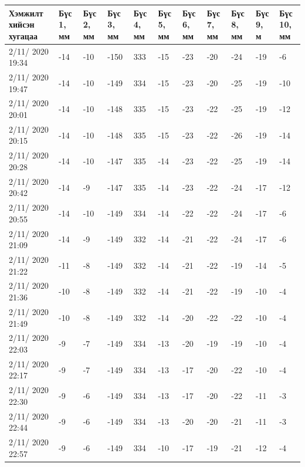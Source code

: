 \begin{table}[h]
    \centering
    \begin{tabular}{|p{1.5cm}|p{0.8cm}|p{0.8cm}|p{0.8cm}|p{0.8cm}|p{0.8cm}|p{0.8cm}|p{0.8cm}|p{0.8cm}|p{0.8cm}|p{0.8cm}|}
         \hline
     Хэмжилт хийсэн хугацаа & Бүс 1, мм&	Бүс 2, мм&	Бүс 3, мм&	Бүс 4, мм&	Бүс 5, мм&	Бүс 6, мм&	Бүс 7, мм&	Бүс 8, мм&	Бүс 9, м&	Бүс 10, мм \\ \hline
2/11/ 2020 19:34&	-14&	-10&-150&	333&-15&-23&-20&-24&-19&	-6 \\ \hline
2/11/ 2020 19:47&	-14&	-10&-149&	334&-15&-23&-20&-25&-19&	-10 \\ \hline
2/11/ 2020 20:01&	-14&	-10&-148&	335&-15&-23&-22&-25&-19&	-12 \\ \hline
2/11/ 2020 20:15&	-14&	-10&-148&	335&-15&-23&-22&-26&-19&	-14 \\ \hline
2/11/ 2020 20:28&	-14&	-10&-147&	335&-14&-23&-22&-25&-19&	-14 \\ \hline
2/11/ 2020 20:42&	-14&	-9&	-147&	335&-14&-23&-22&-24&-17&	-12 \\ \hline
2/11/ 2020 20:55&	-14&	-10&-149&	334&-14&-22&-22&-24&-17&	-6 \\ \hline
2/11/ 2020 21:09&	-14&	-9&	-149&	332&-14&-21&-22&-24&-17&	-6 \\ \hline
2/11/ 2020 21:22&	-11&	-8&	-149&	332&-14&-21&-22&-19&-14&	-5 \\ \hline
2/11/ 2020 21:36&	-10&	-8&	-149&	332&-14&-21&-22&-19&-10&	-4 \\ \hline
2/11/ 2020 21:49&	-10&	-8&	-149&	332&-14&-20&-22&-22&-10&	-4 \\ \hline
2/11/ 2020 22:03&	-9&	    -7&	-149&	334&-13&-20&-19&-19&-10&	-4 \\ \hline
2/11/ 2020 22:17&	-9&	    -7&	-149&	334&-13&-17&-20&-22&-10&	-4 \\ \hline
2/11/ 2020 22:30&	-9&	    -6&	-149&	334&-13&-17&-20&-22&-11&	-3 \\ \hline
2/11/ 2020 22:44&	-9&	    -6&	-149&	334&-13&-20&-20&-21&-11&	-3 \\ \hline
2/11/ 2020 22:57&	-9& 	-6&	-149&	334&-10&-17&-19&-21&-12&	-4 \\ \hline
    \end{tabular}
\end{table}

